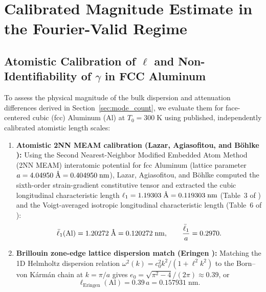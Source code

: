 \section{Calibrated Magnitude Estimate in the Fourier-Valid Regime}\label{sec:calibration}

\subsection{Atomistic Calibration of $\ell$ and Non-Identifiability of $\gamma$ in FCC Aluminum}\label{subsec:al_calibration}

To assess the physical magnitude of the bulk dispersion and attenuation differences derived in Section~\ref{sec:mode_count}, we evaluate them for face-centered cubic (fcc) Aluminum (Al) at $T_0 = 300\;\mathrm{K}$ using published, independently calibrated atomistic length scales:
\begin{enumerate}[leftmargin=*,align=left]
  \item \textbf{Atomistic 2NN MEAM calibration (Lazar, Agiasofitou, and B{\"o}hlke \cite{Lazar2022}):} Using the Second Nearest-Neighbor Modified Embedded Atom Method (2NN MEAM) interatomic potential for fcc Aluminum (lattice parameter $a = 4.04950\;\text{\normalfont\AA} = 0.404950\;\mathrm{nm}$), Lazar, Agiasofitou, and B{\"o}hlke \cite{Lazar2022} computed the sixth-order strain-gradient constitutive tensor and extracted the cubic longitudinal characteristic length $\ell_1 = 1.19303\;\text{\normalfont\AA} = 0.119303\;\mathrm{nm}$ (Table~3 of \cite{Lazar2022}) and the Voigt-averaged isotropic longitudinal characteristic length (Table~6 of \cite{Lazar2022}):
  \begin{equation}\label{eq:lazar_ell}
    \bar{\ell}_1(\mathrm{Al}) = 1.20272\;\text{\normalfont\AA} = 0.120272\;\mathrm{nm}, \qquad
    \frac{\bar{\ell}_1}{a} = 0.2970.
  \end{equation}
  \item \textbf{Brillouin zone-edge lattice dispersion match (Eringen \cite{Eringen1972Linear,Eringen2002}):} Matching the 1D Helmholtz dispersion relation $\omega^2(k) = c_0^2 k^2/(1+\ell^2 k^2)$ to the Born--von K{\'a}rm{\'a}n chain at $k = \pi/a$ gives $e_0 = \sqrt{\pi^2 - 4}/(2\pi) \approx 0.39$, or
  \begin{equation}\label{eq:eringen_ell}
    \ell_{\mathrm{Eringen}}(\mathrm{Al}) = 0.39\,a = 0.157931\;\mathrm{nm}.
  \end{equation}
\end{enumerate}

